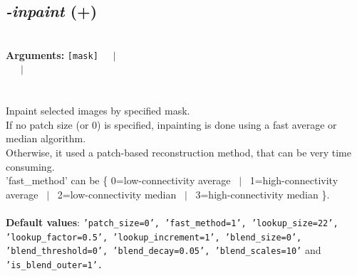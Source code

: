 \documentclass[a4paper,11pt,twoside]{book}
\begin{document}
\subsection{\emph{-inpaint} (+)}\vspace*{-0.5em}
~\\\textbf{Arguments: } 
{\small \texttt{[mask]}}~~~$|$\\
~~~$|$\\
\\~\\
Inpaint selected images by specified mask.
~\\If no patch size (or 0) is specified, inpainting is done using a fast average or median algorithm.
~\\Otherwise, it used a patch-based reconstruction method, that can be very time consuming.
~\\'fast\_method' can be \{ 0=low-connectivity average ~$|$~ 1=high-connectivity average ~$|$~ 2=low-connectivity median ~$|$~ 3=high-connectivity median \}.
~\\~\\\textbf{Default values}: {\small \texttt{'patch\_size=0', 'fast\_method=1', 'lookup\_size=22', 'lookup\_factor=0.5', 'lookup\_increment=1', 'blend\_size=0', 'blend\_threshold=0', 'blend\_decay=0.05', 'blend\_scales=10'} and \texttt{'is\_blend\_outer=1'.}}
\end{document}
